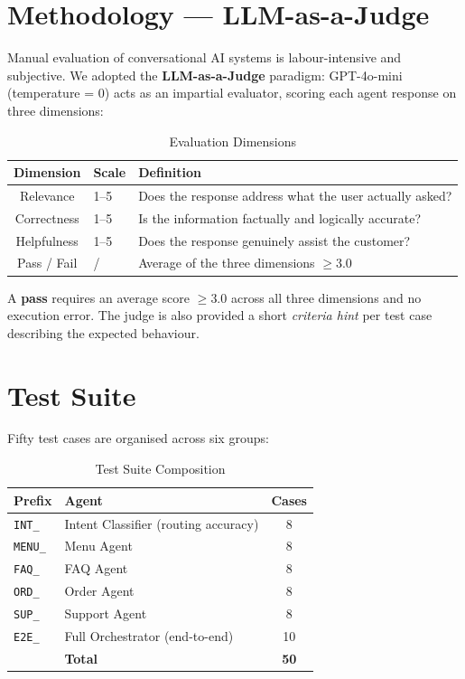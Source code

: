 \documentclass[12pt,a4paper]{report}
\newcommand{\cmark}{\ding{51}}
\newcommand{\xmark}{\ding{55}}
\begin{document}
\section{Methodology — LLM-as-a-Judge}

Manual evaluation of conversational AI systems is labour-intensive and subjective.
We adopted the \textbf{LLM-as-a-Judge} paradigm: GPT-4o-mini (temperature = 0) acts
as an impartial evaluator, scoring each agent response on three dimensions:

\begin{table}[H]
\centering
\caption{Evaluation Dimensions}
\begin{tabular}{clp{7cm}}
\toprule
\textbf{Dimension} & \textbf{Scale} & \textbf{Definition} \\
\midrule
Relevance    & 1–5 & Does the response address what the user actually asked? \\
Correctness  & 1–5 & Is the information factually and logically accurate? \\
Helpfulness  & 1–5 & Does the response genuinely assist the customer? \\
\midrule
Pass / Fail  & \cmark/\xmark  & Average of the three dimensions $\geq 3.0$ \\
\bottomrule
\end{tabular}
\end{table}

A \textbf{pass} requires an average score $\geq 3.0$ across all three dimensions and
no execution error. The judge is also provided a short \textit{criteria hint} per test
case describing the expected behaviour.

\section{Test Suite}

Fifty test cases are organised across six groups:

\begin{table}[H]
\centering
\caption{Test Suite Composition}
\begin{tabular}{llc}
\toprule
\textbf{Prefix} & \textbf{Agent} & \textbf{Cases} \\
\midrule
\texttt{INT\_}  & Intent Classifier (routing accuracy)  & 8  \\
\texttt{MENU\_} & Menu Agent                            & 8  \\
\texttt{FAQ\_}  & FAQ Agent                             & 8  \\
\texttt{ORD\_}  & Order Agent                           & 8  \\
\texttt{SUP\_}  & Support Agent                         & 8  \\
\texttt{E2E\_}  & Full Orchestrator (end-to-end)         & 10 \\
\midrule
               & \textbf{Total}                        & \textbf{50} \\
\bottomrule
\end{tabular}
\end{table}
\end{document}
